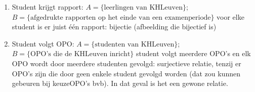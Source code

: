 \begin{oef}
\begin{opl}
\begin{enumerate}
\item Student krijgt rapport: $A=\{\text{leerlingen van KHLeuven}\}$; \\
$B=\{\text{afgedrukte rapporten op het einde van een examenperiode}\}$ voor elke student is er juist één rapport: bijectie (afbeelding die bijectief is)

\item Student volgt OPO: $A=\{\text{studenten van KHLeuven}\}$; \\
$B=\{\text{OPO's die de KHLeuven inricht}\}$ student volgt meerdere OPO's en elk OPO wordt door meerdere studenten gevolgd: surjectieve relatie, tenzij er OPO's zijn die door geen enkele student gevolgd worden (dat zou kunnen gebeuren bij keuzeOPO's bvb). In dat geval is het een gewone relatie.
\end{enumerate}

\end{opl}
\end{oef}

